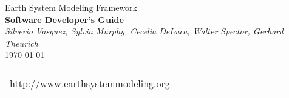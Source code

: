 \documentclass[english,dvips]{article}
\begin{document}

\begin{titlepage}

\begin{center}
{\Large    Earth System Modeling Framework } \\
{\Large {\bf  Software Developer's Guide}} \\
\medskip
{\it Silverio Vasquez, Sylvia Murphy, Cecelia DeLuca, Walter Spector, 
Gerhard Theurich} \\
\vspace{.5in}
{\large \today}
\end{center}

\begin{latexonly}
\vspace{6in}
\begin{tabular}{p{5in}p{.9in}}
\hrulefill \\
\noindent http://www.earthsystemmodeling.org \\
\end{tabular}
\end{latexonly}

\end{titlepage}

\tableofcontents

\newpage












\end{document}
